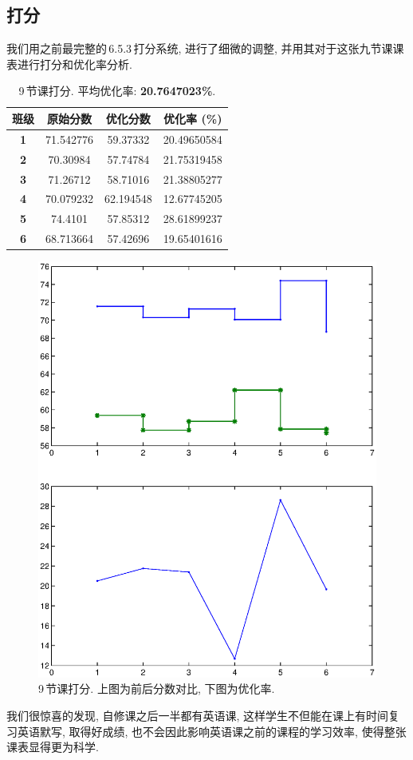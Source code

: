 \documentclass[a4paper]{article}
\begin{document}
 \subsection{打分}
  我们用之前最完整的\,6.5.3\,打分系统, 进行了细微的调整, 并用其对于这张九节课课表进行打分和优化率分析.
  \begin{table}[H]
  \centering
  \begin{tabular}{|c|c|c|c|}
  \hline
  \bf 班级 & \bf 原始分数 & \bf 优化分数 & \bf 优化率 (\%) \\\hline
  \bf 1 & 71.542776 & 59.37332 & 20.49650584 \\\hline
  \bf 2 & 70.30984 & 57.74784 & 21.75319458 \\\hline
  \bf 3 & 71.26712 & 58.71016 & 21.38805277 \\\hline
  \bf 4 & 70.079232 & 62.194548 & 12.67745205 \\\hline
  \bf 5 & 74.4101 & 57.85312 & 28.61899237 \\\hline
  \bf 6 & 68.713664 & 57.42696 & 19.65401616 \\\hline
  \end{tabular}
  \caption{9\,节课打分. 平均优化率: \textbf{20.7647023\%}.}
  \end{table}
  \begin{figure}[H]
  \centerline{\includegraphics[scale=0.7]{9lessons.eps}}
  \caption{9\,节课打分. 上图为前后分数对比, 下图为优化率.}
  \end{figure}
  我们很惊喜的发现, 自修课之后一半都有英语课, 这样学生不但能在课上有时间复习英语默写, 取得好成绩, 也不会因此影响英语课之前的课程的学习效率, 使得整张课表显得更为科学.
\end{document}
